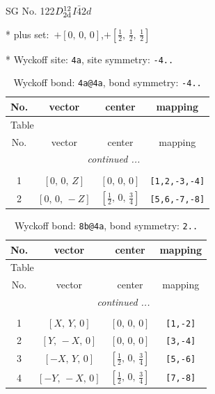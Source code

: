\documentclass[fleqn,8pt]{jsarticle}
\begin{document}
\setcounter{MaxMatrixCols}{32}

\renewcommand{\tablename}{Table~}
\renewcommand{\figurename}{Figure~}
\begin{center}
\LARGE
SG No. 122\quad$D_{\rm 2d}^{12}$\quad$I\bar{4}2d$\quad[ tetragonal ]
\end{center}

* plus set:\,\,\,$+\left[ 0,\, 0,\, 0 \right]$,\quad $+\left[ \frac{1}{2},\, \frac{1}{2},\, \frac{1}{2} \right]$


* Wyckoff site: {\tt 4a}, site symmetry: {\tt -4..}
\renewcommand{\arraystretch}{1.2}
\begin{longtable}{cccc}
\caption{Wyckoff bond: {\tt 4a@4a}, bond symmetry: {\tt -4..}}
 \\
 \hline \hline
No. & vector & center & mapping \\ \hline \endfirsthead

\multicolumn{3}{l}{\tablename\ \thetable{}} \\
 \hline \hline
No. & vector & center & mapping \\ \hline \endhead

 \hline \hline
\multicolumn{3}{r}{\footnotesize\it continued ...} \\ \endfoot

 \hline \hline
\multicolumn{3}{r}{} \\ \endlastfoot

1 & $\left[ 0,\, 0,\, Z \right]$ & $\left[ 0,\, 0,\, 0 \right]$ & {\tt [1,2,-3,-4]} \\ \hline
2 & $\left[ 0,\, 0,\, - Z \right]$ & $\left[ \frac{1}{2},\, 0,\, \frac{3}{4} \right]$ & {\tt [5,6,-7,-8]} \\
\end{longtable}
\renewcommand{\arraystretch}{1.2}
\begin{longtable}{cccc}
\caption{Wyckoff bond: {\tt 8b@4a}, bond symmetry: {\tt 2..}}
 \\
 \hline \hline
No. & vector & center & mapping \\ \hline \endfirsthead

\multicolumn{3}{l}{\tablename\ \thetable{}} \\
 \hline \hline
No. & vector & center & mapping \\ \hline \endhead

 \hline \hline
\multicolumn{3}{r}{\footnotesize\it continued ...} \\ \endfoot

 \hline \hline
\multicolumn{3}{r}{} \\ \endlastfoot

1 & $\left[ X,\, Y,\, 0 \right]$ & $\left[ 0,\, 0,\, 0 \right]$ & {\tt [1,-2]} \\ \hline
2 & $\left[ Y,\, - X,\, 0 \right]$ & $\left[ 0,\, 0,\, 0 \right]$ & {\tt [3,-4]} \\ \hline
3 & $\left[ - X,\, Y,\, 0 \right]$ & $\left[ \frac{1}{2},\, 0,\, \frac{3}{4} \right]$ & {\tt [5,-6]} \\ \hline
4 & $\left[ - Y,\, - X,\, 0 \right]$ & $\left[ \frac{1}{2},\, 0,\, \frac{3}{4} \right]$ & {\tt [7,-8]} \\
\end{longtable}
\end{document}
